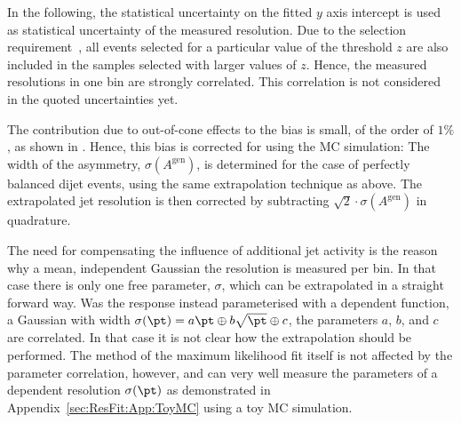In the following, the statistical uncertainty on the fitted $y$ axis
intercept is used as statistical uncertainty of the measured resolution.
Due to the selection requirement~,
all events selected for a particular value of the threshold $z$ are
also included in the samples selected with larger values of $z$.
Hence, the measured resolutions in one \ptave bin are strongly correlated.
This correlation is not considered in the quoted uncertainties yet.

The contribution due to out-of-cone effects to the bias is small, of
the order of $1\%$, as shown in
.
Hence, this bias is corrected for using the MC simulation:
The width of the \ptgen asymmetry, $\sigma(A^{\text{gen}})$, is determined for the
 case of perfectly balanced dijet events, using the
same extrapolation technique as above.
The extrapolated jet \pt resolution is then corrected by 
subtracting $\sqrt{2}\cdot\sigma(A^{\text{gen}})$ in quadrature.

The need for compensating the influence of additional jet activity is
the reason why a mean, \pt independent Gaussian the resolution is
measured per \ptave bin.
In that case there is only one free parameter, $\sigma$, which can be
extrapolated in a straight forward way.
Was the response instead parameterised with a \pt dependent function,
\eg a Gaussian with width \mbox{$\sigma(\pt) = a\pt \oplus
  b\sqrt{\pt} \oplus c$},
the parameters $a$, $b$, and $c$ are correlated.
In that case it is not clear how the extrapolation should be
performed.
The method of the maximum likelihood fit itself is not affected by the
parameter correlation, however, and can very well measure the
parameters of a \pt dependent resolution $\sigma(\pt)$ as demonstrated
in Appendix~\ref{sec:ResFit:App:ToyMC} using a toy MC simulation.

